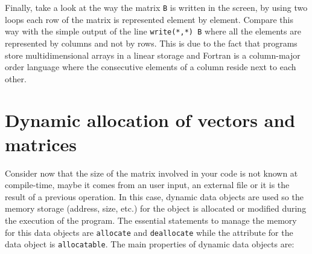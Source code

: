 Finally, take a look at the way the matrix \texttt{B} is written in the screen, by using two loops each row of the matrix is represented element by element.
Compare this way with the simple output of the line \texttt{write(*,*) B} where all the elements are represented by columns and not by rows. This is due to the fact 
that programs store multidimensional arrays in a linear storage and Fortran is a column-major order language where the consecutive elements of a column reside next to each other.



 

 



\newpage  
\section{Dynamic allocation of vectors and matrices} 

Consider now that the size of the matrix involved in your code is not known at compile-time, maybe it 
comes from an user input, an external file or it is the result of a previous operation. In this case, dynamic data objects are used 
so the memory storage (address, size, etc.) for the object is allocated or modified during the execution of the program.
The essential statements to manage the memory for this data objects are \texttt{allocate} and \texttt{deallocate} 
while the attribute for the data object is \texttt{allocatable}. The main properties of dynamic data objects are:

